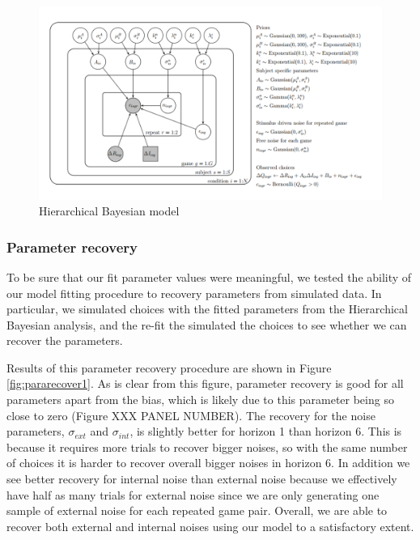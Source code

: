 \documentclass[12pt]{article}
\begin{document}
	\begin{figure}[H]
		\begin{center}
			\includegraphics[width=\textwidth]{figures/hbm.pdf}
			\caption{Hierarchical Bayesian model}
			\label{fig:model}
		\end{center}
	\end{figure}
	
	\subsubsection*{Parameter recovery\label{ch:appendix:bayesrecovery}}
	
	To be sure that our fit parameter values were meaningful, we tested the ability of our model fitting procedure to recovery parameters from simulated data.  In particular, we simulated choices with the fitted parameters from the Hierarchical Bayesian analysis, and the re-fit the simulated the choices to see whether we can recover the parameters. 
	
	Results of this parameter recovery procedure are shown in Figure \ref{fig:pararecover1}. As is clear from this figure, parameter recovery is good for all parameters apart from the bias, which is likely due to this parameter being so close to zero (Figure XXX PANEL NUMBER).  The recovery for the noise parameters, $\sigma_{ext}$ and $\sigma_{int}$, is slightly better for horizon 1 than horizon 6. This is because it requires more trials to recover bigger noises, so with the same number of choices it is harder to recover overall bigger noises in horizon 6. In addition we see better recovery for internal noise than external noise because we effectively have half as many trials for external noise since we are only generating one sample of external noise for each repeated game pair. Overall, we are able to recover both external and internal noises using our model to a satisfactory extent.
	
\end{document}
